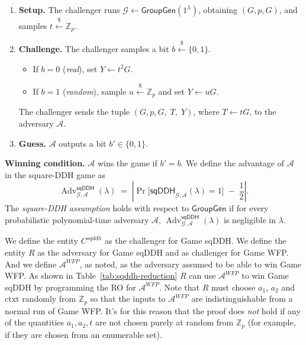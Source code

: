 \documentclass[11pt]{article}
\begin{document}
\begin{enumerate}
  \item \textbf{Setup.} The challenger runs
    $\mathcal{G} \gets \mathsf{GroupGen}(1^{\lambda})$, obtaining
    $(G, p, G)$, and samples
    $t \xleftarrow{\$} \mathbb{Z}_{p}$.

  \item \textbf{Challenge.} The challenger samples a bit
    $b \xleftarrow{\$} \{0, 1\}$.
    \begin{itemize}
      \item If $b = 0$ (\emph{real}), set $Y \gets t^{2}G$.
      \item If $b = 1$ (\emph{random}), sample
        $u \xleftarrow{\$} \mathbb{Z}_{p}$ and set $Y \gets uG$.
    \end{itemize}
    The challenger sends the tuple $(G, p, G,\; T,\; Y)$, where
    $T \gets tG$, to the adversary $\mathcal{A}$.

  \item \textbf{Guess.} $\mathcal{A}$ outputs a bit
    $b' \in \{0, 1\}$.
\end{enumerate}

\medskip\noindent
\textbf{Winning condition.} $\mathcal{A}$ wins the game if $b' = b$.
We define the advantage of $\mathcal{A}$ in the square-DDH game as
$$
\operatorname{Adv}^{\mathsf{sqDDH}}_{\mathcal{G},\mathcal{A}}(\lambda)
\;=\;
\left|
  \Pr\!\big[\mathsf{sqDDH}_{\mathcal{G},\mathcal{A}}(\lambda) = 1\big]
  \;-\;
  \frac{1}{2}
\right|.
$$
The \emph{square-DDH assumption} holds with respect to
$\mathsf{GroupGen}$ if for every probabilistic polynomial-time adversary
$\mathcal{A}$,
$\operatorname{Adv}^{\mathsf{sqDDH}}_{\mathcal{G},\mathcal{A}}(\lambda)$
is negligible in $\lambda$.

We define the entity $C^{sqddh}$ as the challenger for Game sqDDH. We define the entity $R$ as the adversary for Game sqDDH and as challenger for Game WFP. And we define $\mathcal{A}^{WFP}$, as noted, as the adversary assumed to be able to win Game WFP. As shown in Table~\ref{tab:sqddh-reduction} $R$ can use $\mathcal{A}^{WFP}$ to win Game sqDDH by programming the RO for $\mathcal{A}^{WFP}$. Note that $R$ must choose $a_1$, $a_2$ and $\textrm{ctxt}$ randomly from $\mathbb{Z}_p$ so that the inputs to $\mathcal{A}^{WFP}$ are indistinguishable from a normal run of Game WFP. It's for this reason that the proof does \emph{not} hold if any of the quantities $a_1, a_2, t$ are not chosen purely at random from $\mathbb{Z}_p$ (for example, if they are chosen from an enumerable set).
\end{document}
